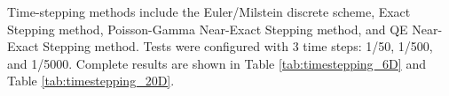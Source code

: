 Time-stepping methods include the Euler/Milstein discrete scheme, Exact Stepping method, Poisson-Gamma Near-Exact Stepping method, and QE Near-Exact Stepping method. Tests were configured with 3 time steps: 1/50, 1/500, and 1/5000. Complete results are shown in Table \ref{tab:timestepping_6D} and Table \ref{tab:timestepping_20D}.
\begin{table}[htbp]
  \centering
  \caption{Time-Stepping Monte Carlo Option Pricing Results (6D)}
  \label{tab:timestepping_6D}
\end{table}
